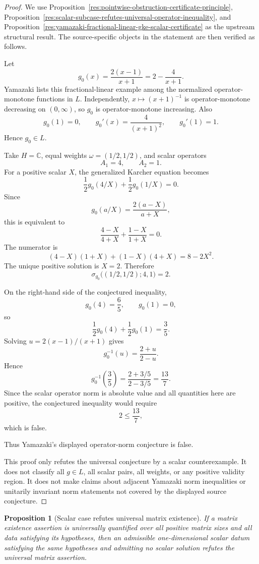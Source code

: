 \documentclass[11pt]{article}
\numberwithin{equation}{section}
\newtheorem{proposition}[theorem]{Proposition}
\theoremstyle{definition}
\theoremstyle{remark}
\newcommand{\1}{\mathbf 1}
\begin{document}
\begin{proof}
We use Proposition~\ref{res:pointwise-obstruction-certificate-principle}, Proposition~\ref{res:scalar-subcase-refutes-universal-operator-inequality}, and Proposition~\ref{res:yamazaki-fractional-linear-gke-scalar-certificate} as the upstream structural result. The source-specific objects in the statement are then verified as follows.

Let
\[
g_0(x)=\frac{2(x-1)}{x+1}=2-\frac4{x+1}.
\]
Yamazaki lists this fractional-linear example among the normalized operator-monotone functions in \(L\). Independently, \(x\mapsto (x+1)^{-1}\) is operator-monotone decreasing on \((0,\infty)\), so \(g_0\) is operator-monotone increasing. Also
\[
g_0(1)=0,\qquad
g_0'(x)=\frac4{(x+1)^2},\qquad
g_0'(1)=1.
\]
Hence \(g_0\in L\).

Take \(H=\mathbb C\), equal weights \(\omega=(1/2,1/2)\), and scalar operators
\[
A_1=4,\qquad A_2=1.
\]
For a positive scalar \(X\), the generalized Karcher equation becomes
\[
\frac12 g_0(4/X)+\frac12 g_0(1/X)=0.
\]
Since
\[
g_0(a/X)=\frac{2(a-X)}{a+X},
\]
this is equivalent to
\[
\frac{4-X}{4+X}+\frac{1-X}{1+X}=0.
\]
The numerator is
\[
(4-X)(1+X)+(1-X)(4+X)=8-2X^2.
\]
The unique positive solution is \(X=2\). Therefore
\[
\sigma_{g_0}\bigl((1/2,1/2);4,1\bigr)=2.
\]

On the right-hand side of the conjectured inequality,
\[
g_0(4)=\frac65,\qquad g_0(1)=0,
\]
so
\[
\frac12 g_0(4)+\frac12 g_0(1)=\frac35.
\]
Solving \(u=2(x-1)/(x+1)\) gives
\[
g_0^{-1}(u)=\frac{2+u}{2-u}.
\]
Hence
\[
g_0^{-1}\left(\frac35\right)
=\frac{2+3/5}{2-3/5}
=\frac{13}{7}.
\]
Since the scalar operator norm is absolute value and all quantities here are positive, the conjectured inequality would require
\[
2\le \frac{13}{7},
\]
which is false.

Thus Yamazaki's displayed operator-norm conjecture is false.

This proof only refutes the universal conjecture by a scalar counterexample. It does not classify all \(g\in L\), all scalar pairs, all weights, or any positive validity region. It does not make claims about adjacent Yamazaki norm inequalities or unitarily invariant norm statements not covered by the displayed source conjecture.
\end{proof}

\begin{proposition}[Scalar case refutes universal matrix existence]
\label{res:scalar-matrix-case-refutes-universal-existence}
If a matrix existence assertion is universally quantified over all positive matrix sizes and all data satisfying its hypotheses, then an admissible one-dimensional scalar datum satisfying the same hypotheses and admitting no scalar solution refutes the universal matrix assertion.
\end{proposition}
\end{document}
